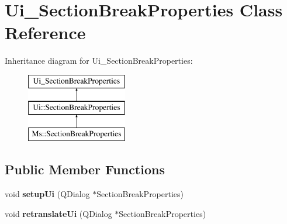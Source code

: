 \hypertarget{class_ui___section_break_properties}{}\section{Ui\+\_\+\+Section\+Break\+Properties Class Reference}
\label{class_ui___section_break_properties}
Inheritance diagram for Ui\+\_\+\+Section\+Break\+Properties\+:\begin{figure}[H]
\begin{center}
\leavevmode
\includegraphics[height=3.000000cm]{class_ui___section_break_properties}
\end{center}
\end{figure}
\subsection*{Public Member Functions}
\begin{DoxyCompactItemize}
\item 
\mbox{\label{class_ui___section_break_properties_a3507c4a0a0aa9525a68679843d3ff439}} 
void {\bfseries setup\+Ui} (Q\+Dialog $\ast$Section\+Break\+Properties)
\item 
\mbox{\label{class_ui___section_break_properties_a0b8c050fca18851b0d1da143453de6e4}} 
void {\bfseries retranslate\+Ui} (Q\+Dialog $\ast$Section\+Break\+Properties)
\end{DoxyCompactItemize}
